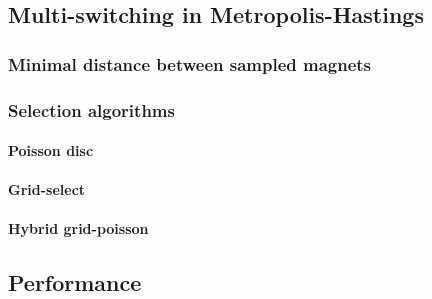 \subsection{Multi-switching in Metropolis-Hastings} \label{sec:2:MultiSwitch}
\subsubsection{Minimal distance between sampled magnets} %
\subsubsection{Selection algorithms}
\paragraph{Poisson disc}
\paragraph{Grid-select}
\paragraph{Hybrid grid-poisson}

\subsection{Performance}
